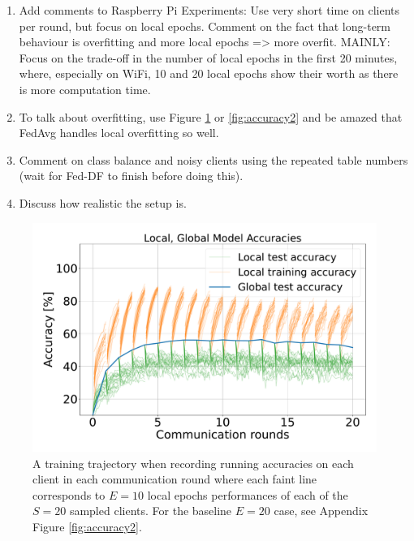 \documentclass{article}
\begin{document}
\begin{enumerate}
    \item Add comments to Raspberry Pi Experiments: Use very short time on clients per round, but focus on local epochs.
        Comment on the fact that long-term behaviour is overfitting and more local epochs => more overfit.
        MAINLY: Focus on the trade-off in the number of local epochs in the first 20 minutes, where, especially on WiFi, 10 and 20 local epochs show their worth as there is more computation time.
    \item To talk about overfitting, use Figure \ref{fig:accuracy} or \ref{fig:accuracy2} and be amazed that FedAvg handles local overfitting so well.
    \item Comment on class balance and noisy clients using the repeated table numbers (wait for Fed-DF to finish before doing this).
    \item Discuss how realistic the setup is.
\end{enumerate}

\begin{figure}[htb!]
    \centering
        \includegraphics[width=\linewidth]{imgs/accuracyE10.pdf}
    \caption{
        A training trajectory when recording running accuracies on each client in each communication round where each faint line corresponds to $E=10$ local epochs performances of each of the $S=20$ sampled clients.
        For the baseline $E=20$ case, see Appendix Figure \ref{fig:accuracy2}.
    }
    \label{fig:accuracy}
\end{figure}\noindent


\vfill
\pagebreak



\end{document}
